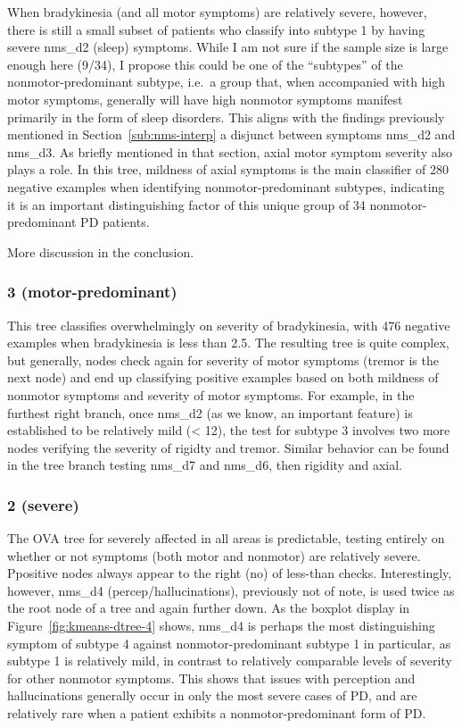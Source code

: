 \documentclass[letterpaper,12pt]{article}
\begin{document}
When bradykinesia (and all motor symptoms) are relatively severe, however,
there is still a small subset of patients who classify into subtype 1 by having
severe nms\_d2 (sleep) symptoms. While I am not sure if the sample size is
large enough here (9/34), I propose this could be one of the ``subtypes'' of
the nonmotor-predominant subtype, i.e.\ a group that, when accompanied with
high motor symptoms, generally will have high nonmotor symptoms manifest
primarily in the form of sleep disorders. This aligns with the findings
previously mentioned in Section~\ref{sub:nms-interp} a disjunct between
symptoms nms\_d2 and nms\_d3. As briefly mentioned in that section, axial motor
symptom severity also plays a role. In this tree, mildness of axial symptoms is
the main classifier of 280 negative examples when identifying
nonmotor-predominant
subtypes, indicating it is an important distinguishing factor of this unique
group of 34 nonmotor-predominant PD patients.

More discussion in the
conclusion.

\subsubsection{3 (motor-predominant)}

This tree classifies overwhelmingly on severity of bradykinesia, with 476
negative examples when bradykinesia is less than 2.5. The resulting tree is
quite complex, but generally, nodes check again for severity of motor
symptoms (tremor is the next node) and end up classifying positive examples
based on both mildness of nonmotor symptoms and severity of motor symptoms. For
example, in the furthest right branch, once nms\_d2 (as we know, an important
feature) is established to be relatively mild (< 12), the test for subtype 3
involves two more nodes verifying the severity of rigidty and tremor. Similar
behavior can be found in the tree branch testing nms\_d7 and nms\_d6, then
rigidity and axial.

\subsubsection{2 (severe)}

The OVA tree for severely affected in all areas is predictable, testing
entirely on whether or not symptoms (both motor and nonmotor) are relatively
severe. Ppositive nodes always appear to the right (no) of less-than checks.
Interestingly, however, nms\_d4 (percep/hallucinations), previously not of note, is used twice as the
root node of a tree and again further down. As the boxplot display in
Figure~\ref{fig:kmeans-dtree-4} shows, nms\_d4 is perhaps the most
distinguishing symptom of subtype 4 against nonmotor-predominant subtype 1 in
particular, as subtype 1 is relatively mild, in contrast to relatively
comparable levels of severity for other nonmotor symptoms. This shows that
issues with
perception and hallucinations generally occur in only the most severe cases of
PD, and are relatively rare when a patient exhibits a nonmotor-predominant form
of PD.
\end{document}
